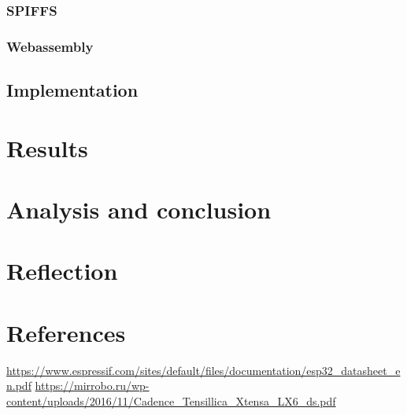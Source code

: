 \documentclass{article}
\begin{document}
\subsubsection{SPIFFS}
\subsubsection{Webassembly}
\subsection{Implementation}


\section{Results}


\section{Analysis and conclusion}


\section{Reflection}


\section{References}
\begin{thebibliography}{9}
	\url{https://www.espressif.com/sites/default/files/documentation/esp32_datasheet_en.pdf}
	\url{https://mirrobo.ru/wp-content/uploads/2016/11/Cadence_Tensillica_Xtensa_LX6_ds.pdf}
\end{thebibliography}
\end{document}
